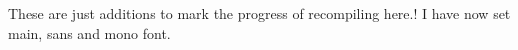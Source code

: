These are just additions to mark the progress of recompiling here.!
I have now set main, sans and mono font.
